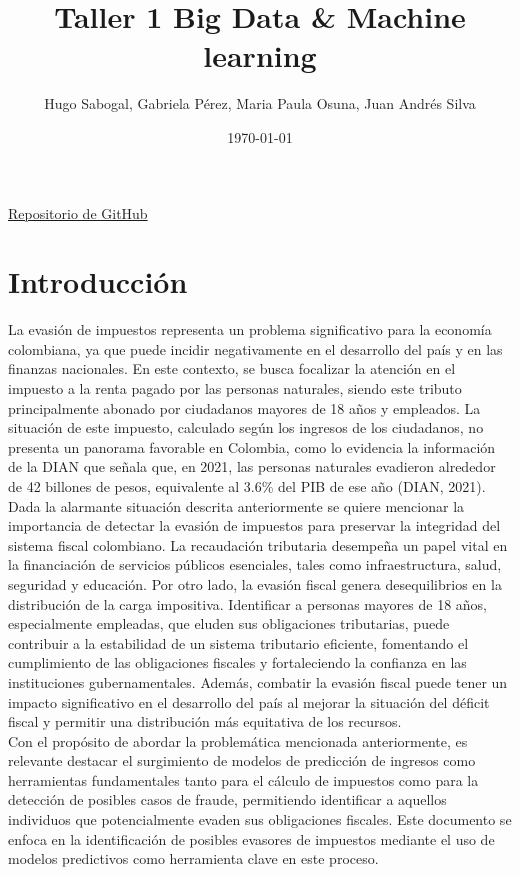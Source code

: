 \documentclass[12pt]{article}
\title{\textbf{Taller 1 Big Data \& Machine learning}}
\author{Hugo Sabogal, Gabriela Pérez, Maria Paula Osuna, Juan Andrés Silva}
\affil{Universidad de los Andes \\ Facultad de Economía}
\date{\today }
\begin{document}
\maketitle

\begin{center}
    \href{https://github.com/Hugo-Andres-Sabogal-Perez/Problem-set-1}{\label{repo}Repositorio de GitHub}
\end{center}


\section{Introducción}

La evasión de impuestos representa un problema significativo para la economía colombiana, ya que puede incidir negativamente en el desarrollo del país y en las finanzas nacionales. En este contexto, se busca focalizar la atención en el impuesto a la renta pagado por las personas naturales, siendo este tributo principalmente abonado por ciudadanos mayores de 18 años y empleados. La situación de este impuesto, calculado según los ingresos de los ciudadanos, no presenta un panorama favorable en Colombia, como lo evidencia la información de la DIAN que señala que, en 2021, las personas naturales evadieron alrededor de 42 billones de pesos, equivalente al 3.6\% del PIB de ese año (DIAN, 2021). \\


Dada la alarmante situación descrita anteriormente se quiere mencionar la importancia de detectar la evasión de impuestos para preservar la integridad del sistema fiscal colombiano. La recaudación tributaria desempeña un papel vital en la financiación de servicios públicos esenciales, tales como infraestructura, salud, seguridad y educación. Por otro lado, la evasión fiscal genera desequilibrios en la distribución de la carga impositiva. Identificar a personas mayores de 18 años, especialmente empleadas, que eluden sus obligaciones tributarias, puede contribuir a la estabilidad de un sistema tributario eficiente, fomentando el cumplimiento de las obligaciones fiscales y fortaleciendo la confianza en las instituciones gubernamentales. Además, combatir la evasión fiscal puede tener un impacto significativo en el desarrollo del país al mejorar la situación del déficit fiscal y permitir una distribución más equitativa de los recursos. \\


Con el propósito de abordar la problemática mencionada anteriormente, es relevante destacar el surgimiento de modelos de predicción de ingresos como herramientas fundamentales tanto para el cálculo de impuestos como para la detección de posibles casos de fraude, permitiendo identificar a aquellos individuos que potencialmente evaden sus obligaciones fiscales. Este documento se enfoca en la identificación de posibles evasores de impuestos mediante el uso de modelos predictivos como herramienta clave en este proceso. \\
\end{document}
